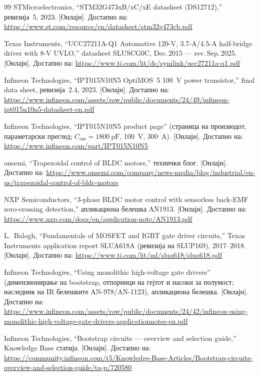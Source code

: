 \documentclass[journal,onecolumn,11pt]{IEEEtran}
\begin{document}
\begin{thebibliography}{99}
 STMicroelectronics, ``STM32G473xB/xC/xE datasheet (DS12712),'' ревизија~5, 2023.
[Онлајн]. Достапно на: \url{https://www.st.com/resource/en/datasheet/stm32g473cb.pdf}

 Texas Instruments, ``UCC27211A-Q1 Automotive 120-V, 3.7-A/4.5-A half-bridge
driver with 8-V UVLO,'' datasheet SLUSCG0C, Dec.\,2015 --- rev.\,Sep.\,2025. [Онлајн]. Достапно на:
\url{https://www.ti.com/lit/ds/symlink/ucc27211a-q1.pdf}

 Infineon Technologies, ``IPT015N10N5 OptiMOS\texttrademark~5 \SI{100}{\volt}
power transistor,'' final data sheet, ревизија~2.4, 2023. [Онлајн]. Достапно на:
\url{https://www.infineon.com/assets/row/public/documents/24/49/infineon-ipt015n10n5-datasheet-en.pdf}

 Infineon Technologies, ``IPT015N10N5 product page'' (страница на производот,
параметарски преглед; \(C_{\mathrm{oss}}=\SI{1800}{\pico\farad}\), \SI{100}{\volt}, \SI{300}{\ampere}).
[Онлајн]. Достапно на: \url{https://www.infineon.com/part/IPT015N10N5}

 onsemi, ``Trapezoidal control of BLDC motors,'' технички блог. [Онлајн].
Достапно на: \url{https://www.onsemi.com/company/news-media/blog/industrial/en-us/trapezoidal-control-of-bldc-motors}

 NXP Semiconductors, ``3-phase BLDC motor control with sensorless back-EMF
zero-crossing detection,'' апликациона белешка AN1913. [Онлајн]. Достапно на:
\url{https://www.nxp.com/docs/en/application-note/AN1913.pdf}

 L.~Balogh, ``Fundamentals of MOSFET and IGBT gate driver circuits,'' Texas
Instruments application report SLUA618A (ревизија на SLUP169), 2017--2018. [Онлајн]. Достапно на:
\url{https://www.ti.com/lit/ml/slua618/slua618.pdf}

 Infineon Technologies, ``Using monolithic high-voltage gate drivers''
(димензионирање на bootstrap, отпорници на гејтот и насоки за полумост; наследник на IR белешките
AN-978/AN-1123), апликациона белешка. [Онлајн]. Достапно на:
\url{https://www.infineon.com/assets/row/public/documents/24/42/infineon-using-monolithic-high-voltage-gate-drivers-applicationnotes-en.pdf}

 Infineon Technologies, ``Bootstrap circuits --- overview and
selection guide,'' Knowledge Base статија. [Онлајн]. Достапно на:
\url{https://community.infineon.com/t5/Knowledge-Base-Articles/Bootstrap-circuits-overview-and-selection-guide/ta-p/720580}


\end{thebibliography}
\end{document}
